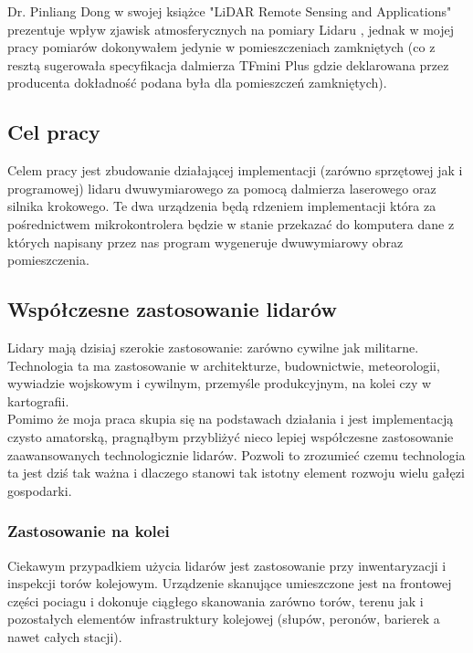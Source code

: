 Dr. Pinliang Dong w swojej książce "LiDAR Remote Sensing and Applications" prezentuje wpływ zjawisk atmosferycznych na pomiary Lidaru \cite{dong}, jednak w mojej pracy pomiarów dokonywałem jedynie w pomieszczeniach zamkniętych (co z resztą sugerowała specyfikacja dalmierza TFmini Plus gdzie deklarowana przez producenta dokładność podana była dla pomieszczeń zamkniętych).\\

\subsection {Cel pracy}
Celem pracy jest zbudowanie działającej implementacji (zarówno sprzętowej jak i programowej) lidaru dwuwymiarowego za pomocą dalmierza laserowego oraz silnika krokowego. Te dwa urządzenia będą rdzeniem implementacji która za pośrednictwem mikrokontrolera będzie w stanie przekazać do komputera dane z których napisany przez nas program wygeneruje dwuwymiarowy obraz pomieszczenia.

\subsection {Współczesne zastosowanie lidarów}
Lidary mają dzisiaj szerokie zastosowanie: zarówno cywilne jak militarne. Technologia ta ma zastosowanie w architekturze, budownictwie, meteorologii, wywiadzie wojskowym i cywilnym, przemyśle produkcyjnym, na kolei czy w kartografii.\\

Pomimo że moja praca skupia się na podstawach działania i jest implementacją czysto amatorską, pragnąłbym przybliżyć nieco lepiej współczesne zastosowanie zaawansowanych technologicznie lidarów. Pozwoli to zrozumieć czemu technologia ta jest dziś tak ważna i dlaczego stanowi tak istotny element rozwoju wielu gałęzi gospodarki.\\

\subsubsection{Zastosowanie na kolei}
Ciekawym przypadkiem użycia lidarów jest zastosowanie przy inwentaryzacji i inspekcji torów kolejowym. Urządzenie skanujące umieszczone jest na frontowej części pociagu i dokonuje ciągłego skanowania zarówno torów, terenu jak i pozostałych elementów infrastruktury kolejowej (słupów, peronów, barierek a nawet całych stacji).\\

